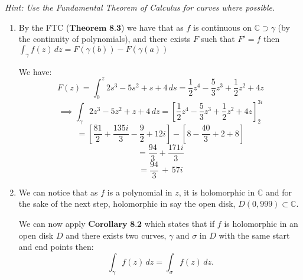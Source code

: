 \documentclass[12pt]{article}
\begin{document}
\noindent \textit{Hint: Use the Fundamental Theorem of Calculus for curves where possible.}\newline
\noindent \begin{enumerate}[label=\textbf{(\roman*)}]
 \item By the FTC (\(\textbf{Theorem 8.3}\)) we have that as \(f\) is continuous on \(\mathbb{C} \supset \gamma\) (by the continuity of polynomials), and there exists \(F\) such that \(F' = f\) then \(\int_{\gamma} f(z) \, dz = F(\gamma(b)) - F(\gamma(a))\) 

 We have:
 \[F(z) = \int_{0}^{z} 2s^3 - 5s^2 + s + 4 \, ds = \frac{1}{2}z^4 -\frac{5}{3}z^3 + \frac{1}{2}z^2 + 4z\]
 \[\implies \int_{\gamma} 2z^3 - 5z^2 + z + 4 \, dz = \left[  \frac{1}{2}z^4 -\frac{5}{3}z^3 + \frac{1}{2}z^2 + 4z\right]_{2}^{3i} \]
 \[= \left[\frac{81}{2} +\frac{135i}{3} -\frac{9}{2} +12i\right] - \left[8-\frac{40}{3}+2+8\right]\]
 \[= \frac{94}{3} + \frac{171i}{3} \]
 \[= \frac{94}{3} \,+ \,57i \]

 \item We can notice that as \(f\) is a polynomial in \(z\), it is holomorphic in \(\mathbb{C}\) and for the sake of the next step, holomorphic in say the open disk, \(D(0,999) \subset \mathbb{C}\). 

 We can now apply \(\textbf{Corollary 8.2}\) which states that if \(f\) is holomorphic in an open disk \(D\) and there exists two curves, \(\gamma \text{ and } \sigma\) in \(D\) with the same start and end points then:
 \[
 \int_{\gamma} f(z)\,dz = \int_{\sigma} f(z) \, dz.
 \]

 

\end{enumerate}
\end{document}

